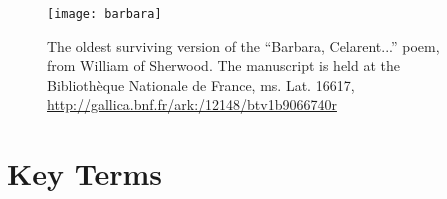 \begin{figure}[!ht]
\texttt{[image: barbara]}

\caption{The oldest surviving version of the ``Barbara, Celarent...'' poem, from William of Sherwood. The manuscript is held at the Biblioth\`eque Nationale de France, ms. Lat. 16617, \url{http://gallica.bnf.fr/ark:/12148/btv1b9066740r}}
\label{fig:barbara}
\end{figure}


\section*{Key Terms}
\begin{sortedlist}

\end{sortedlist}
